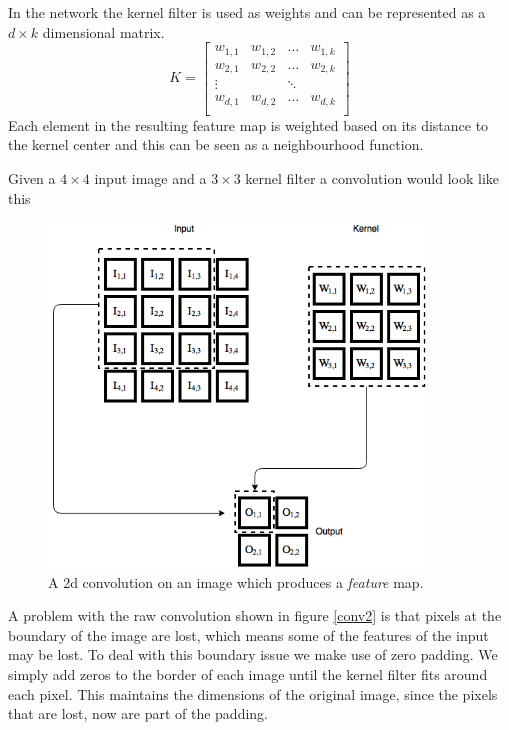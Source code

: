 \documentclass[11pt]{article}
\begin{document}
In the network the kernel filter is used as weights and can be represented as a $d \times k$ dimensional matrix.
$$
K =
\begin{bmatrix}
    w_{1,1 } & w_{1, 2} & \hdots & w_{1, k} \\
    w_{2,1 } & w_{2, 2} & \hdots & w_{2, k} \\
    \vdots   &          & \ddots &          \\
    w_{d,1 } & w_{d, 2} & \hdots & w_{d, k} \\
\end{bmatrix}
$$
Each element in the resulting feature map is weighted based on its distance to the kernel center
and this can be seen as a neighbourhood function.

Given a $4 \times 4$ input image and a $3 \times 3$ kernel filter a convolution
would look like this
\begin{figure}[!h]\label{con2}
    \centering
    \includegraphics[width=10cm]{include/conv_2.png}
    \caption{A 2d convolution on an image which produces a \textit{feature} map.}
    \label{fig:conv}
\end{figure}

A problem with the raw convolution shown in figure \ref{conv2} is that
pixels at the boundary of the image are lost, which means some of the
features of the input may be lost.
To deal with this boundary issue we make use of zero padding.
We simply add zeros to the border of each image until the kernel
filter fits around each pixel.
This maintains the dimensions of the original image, since the pixels that are lost, now are
part of the padding.
\end{document}
